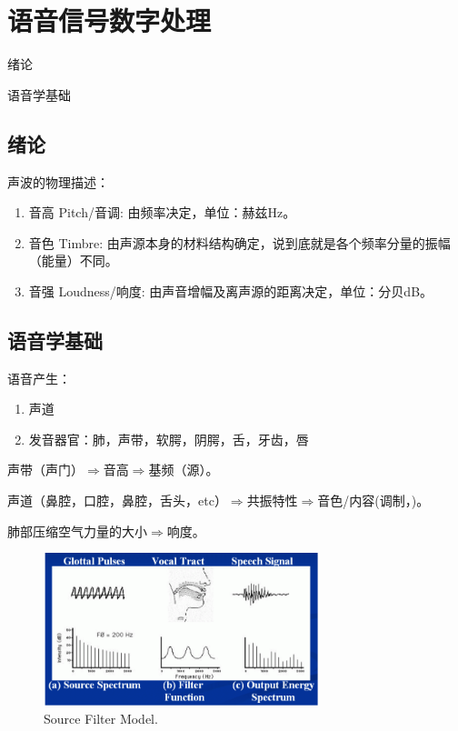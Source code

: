 \chapter{语音信号数字处理}
\label{chap:speech_processing}


\begin{learningobjectives}
	\item 绪论
	\item 语音学基础
\end{learningobjectives}


\section{绪论}

声波的物理描述：
\begin{enumerate}
	\item 音高 Pitch/音调: 由频率决定，单位：赫兹Hz。
	\item 音色 Timbre: 由声源本身的材料结构确定，说到底就是各个频率分量的振幅（能量）不同。
	\item 音强 Loudness/响度: 由声音增幅及离声源的距离决定，单位：分贝dB。
\end{enumerate}

\section{语音学基础}

语音产生：
\begin{enumerate}
	\item 声道
	\item 发音器官：肺，声带，软腭，阴腭，舌，牙齿，唇
	
\end{enumerate}

声带（声门）$\Rightarrow$音高$\Rightarrow$基频（源）。


声道（鼻腔，口腔，鼻腔，舌头，etc）$\Rightarrow$共振特性$\Rightarrow$音色/内容(调制，)。

肺部压缩空气力量的大小$\Rightarrow$响度。

\begin{figure}[!h]
	\centerline{\includegraphics[width=8.0cm]{figs/speech_source_filter_model.png}}
	\caption{Source Filter Model.}
	\label{fig:Source_Filter_Model}
\end{figure}

